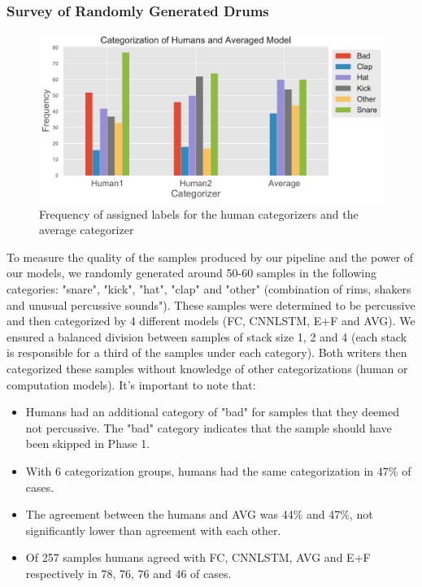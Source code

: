 \documentclass{nime-alternate} %
\begin{document}
 \subsubsection{Survey of Randomly Generated Drums}
\label{survey}
\begin{figure}[H]
\centering
\includegraphics[width=1.1\linewidth]{images/cat.pdf}
\caption{Frequency of assigned labels for the human categorizers and the average categorizer}
\label{fig:freq-survey}
\end{figure}
To measure the quality of the samples produced by our pipeline and the power of our models, we randomly generated around 50-60 samples in the following categories: "snare", "kick", "hat", "clap" and "other" (combination of rims, 
shakers and unusual percussive sounds"). These samples were determined to be percussive and then categorized by 4 different models (FC, CNNLSTM, E+F and AVG). We ensured a balanced division between samples of stack size 1, 2 and 4 (each stack is responsible for a third of the samples under each category). Both writers then categorized these samples without knowledge of other categorizations (human or computation models). It's important to note that:
\begin{itemize}
    \item Humans had an additional category of "bad" for samples that they deemed not percussive. The "bad" category indicates that the sample should have been skipped in Phase 1. 
    \item With 6 categorization groups, humans had the same categorization in 47\% of cases.
    \item The agreement between the humans and AVG was 44\% and 47\%, not significantly lower than agreement with each other. 
    \item Of 257 samples humans agreed with FC, CNNLSTM, AVG and E+F respectively in 78, 76, 76 and 46 of cases.
\end{itemize}
\end{document}
